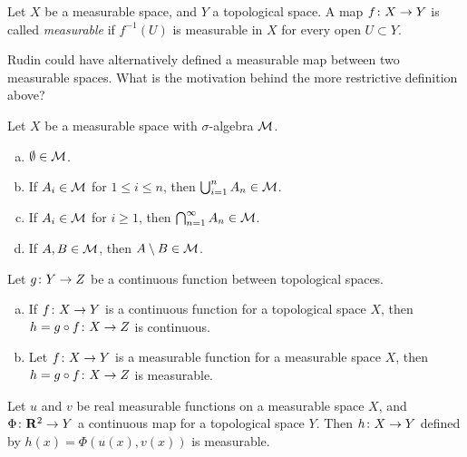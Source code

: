 \begin{definition}
  Let $X$ be a measurable space, and $Y$ a topological space. A map $f \colon X \rightarrow Y$ is called \emph{measurable} if $f^{-1}(U)$ is measurable in $X$ for every open $U \subset Y$. 
\end{definition}

\begin{remark}
  Rudin could have alternatively defined a measurable map between two measurable spaces. What is the motivation behind the more restrictive definition above?
\end{remark}

\begin{proposition}
  Let $X$ be a measurable space with $\sigma$-algebra $\mathcal{M}$.
  \begin{enumerate}[(a)]
  \item $\emptyset \in \mathcal{M}$.
  \item If $A_i \in \mathcal{M}$ for $1 \leq i \leq n$, then $\bigcup_{i=1}^n A_n \in \mathcal{M}$.
  \item If $A_i \in \mathcal{M}$ for $i \geq 1$, then $\bigcap_{n=1}^\infty A_n \in \mathcal{M}$.
  \item If $A, B \in \mathcal{M}$, then $A \setminus B \in \mathcal{M}$.
  \end{enumerate}  
\end{proposition}

\begin{theorem}
  Let $g \colon Y \rightarrow Z$ be a continuous function between topological spaces.
  \begin{enumerate}[(a)]
  \item If $f \colon X \rightarrow Y$ is a continuous function for a topological space $X$, then $h = g \circ f \colon X \rightarrow Z$ is continuous.
  \item Let $f \colon X \rightarrow Y$ is a measurable function for a measurable space $X$, then $h = g \circ f \colon X \rightarrow Z$ is measurable.
  \end{enumerate}
\end{theorem}

\begin{theorem}
  Let $u$ and $v$ be real measurable functions on a measurable space $X$, and $\Phi \colon \mathbf{R}^2 \rightarrow Y$ a continuous map for a topological space $Y$. Then $h \colon X \rightarrow Y$ defined by $h(x) = \Phi(u(x),v(x))$ is measurable.
\end{theorem}

